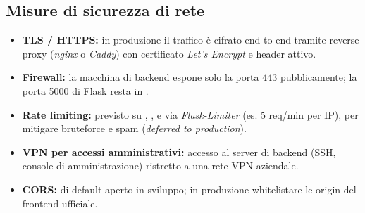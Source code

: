 \subsection{Misure di sicurezza di rete}
\begin{itemize}
    \item \textbf{TLS / HTTPS:} in produzione il traffico è cifrato end-to-end
    tramite reverse proxy (\emph{nginx} o \emph{Caddy}) con certificato
    \emph{Let's Encrypt} e header  attivo.
    \item \textbf{Firewall:} la macchina di backend espone solo la porta 443
    pubblicamente; la porta 5000 di Flask resta in .
    \item \textbf{Rate limiting:} previsto su ,
    ,  e 
    via \emph{Flask-Limiter} (es. 5 req/min per IP), per mitigare bruteforce e
    spam (\emph{deferred to production}).
    \item \textbf{VPN per accessi amministrativi:} accesso al server di
    backend (SSH, console di amministrazione) ristretto a una rete VPN
    aziendale.
    \item \textbf{CORS:} di default aperto in sviluppo; in produzione
    whitelistare le origin del frontend ufficiale.
\end{itemize}
